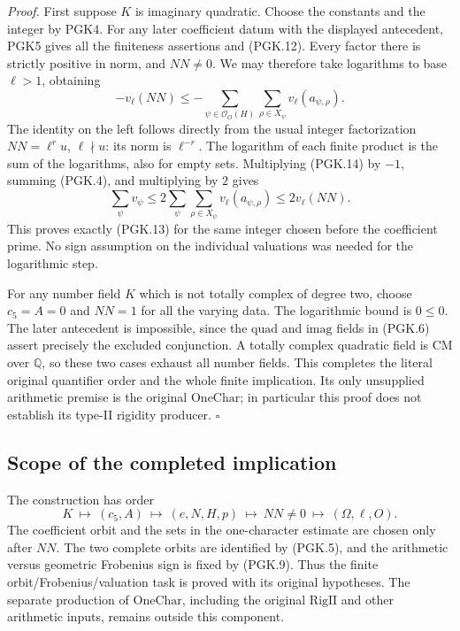 \documentclass[11pt,a4paper]{article}
\numberwithin{equation}{section}
\theoremstyle{remark}\newtheorem{remark}[theorem]{Remark}
\begin{document}
\emph{Proof.}
First suppose \(K\) is imaginary quadratic. Choose the
constants and the integer by PGK4. For any later coefficient
datum with the displayed antecedent, PGK5 gives all the
finiteness assertions and (PGK.12). Every factor there is
strictly positive in norm, and \(NN\ne0\). We may therefore
take logarithms to base \(\ell>1\), obtaining
\[
 -v_\ell(NN)\le
       -\sum_{\psi\in\mathcal O_O(H)}\sum_{\rho\in X_\psi}
                            v_\ell(a_{\psi,\rho}).
 \tag{PGK.14}
\]
The identity on the left follows directly from the usual
integer factorization \(NN=\ell^r u\), \(\ell\nmid u\):
its norm is \(\ell^{-r}\). The logarithm of each finite
product is the sum of the logarithms, also for empty sets.
Multiplying (PGK.14) by \(-1\), summing (PGK.4), and
multiplying by \(2\) gives
\[
 \sum_\psi v_\psi
 \le2\sum_\psi\sum_{\rho\in X_\psi}v_\ell(a_{\psi,\rho})
 \le2v_\ell(NN).
\]
This proves exactly (PGK.13) for the same integer chosen
before the coefficient prime. No sign assumption on the
individual valuations was needed for the logarithmic step.

For any number field \(K\) which is not totally complex of
degree two, choose \(c_5=A=0\) and \(NN=1\) for all the
varying data. The logarithmic bound is \(0\le0\). The later
antecedent is impossible, since the \(\mathrm{quad}\) and
\(\mathrm{imag}\) fields in (PGK.6) assert precisely the
excluded conjunction. A totally complex quadratic field is
CM over \(\mathbb Q\), so these two cases exhaust all
number fields. This completes the literal original quantifier
order and the whole finite implication. Its only unsupplied
arithmetic premise is the original \(\mathrm{OneChar}\);
in particular this proof does not establish its type-II
rigidity producer. \hfill\(\square\)

\subsection{Scope of the completed implication}

The construction has order
\[
 K\ \longmapsto\ (c_5,A)\ \longmapsto\ (e,N,H,p)
 \ \longmapsto\ NN\ne0\ \longmapsto\ (\Omega,\ell,O).
\]
The coefficient orbit and the sets in the one-character
estimate are chosen only after \(NN\). The two complete
orbits are identified by (PGK.5), and the arithmetic versus
geometric Frobenius sign is fixed by (PGK.9). Thus the
finite orbit/Frobenius/valuation task is proved with its
original hypotheses. The separate production of
\(\mathrm{OneChar}\), including the original
\(\mathrm{RigII}\) and other arithmetic inputs, remains outside
this component.
\end{document}
